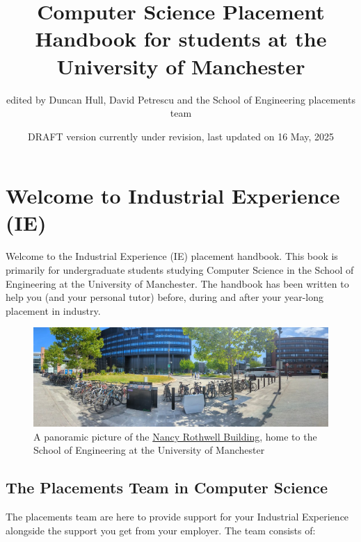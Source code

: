 \documentclass[
]{book}
\title{Computer Science Placement Handbook for students at the University of Manchester}
\author{edited by Duncan Hull, David Petrescu and the School of Engineering placements team}
\date{DRAFT version currently under revision, last updated on 16 May, 2025}
\begin{document}
\maketitle

{
\setcounter{tocdepth}{1}
\tableofcontents
}
\chapter*{Welcome to Industrial Experience (IE)}\label{welcome-to-industrial-experience-ie}

Welcome to the Industrial Experience (IE) placement handbook. This book is primarily for undergraduate students studying Computer Science in the School of Engineering at the University of Manchester. The handbook has been written to help you (and your personal tutor) before, during and after your year-long placement in industry.

\begin{figure}

{\centering \includegraphics[width=1\linewidth]{images/rothwell} 

}

\caption{A panoramic picture of the \href{https://en.wikipedia.org/wiki/Nancy_Rothwell_Building}{Nancy Rothwell Building}, home to the School of Engineering at the University of Manchester}\label{fig:engineering-fig}
\end{figure}



\section{The Placements Team in Computer Science}\label{team}

The placements team are here to provide support for your Industrial Experience alongside the support you get from your employer. The team consists of:
\end{document}
